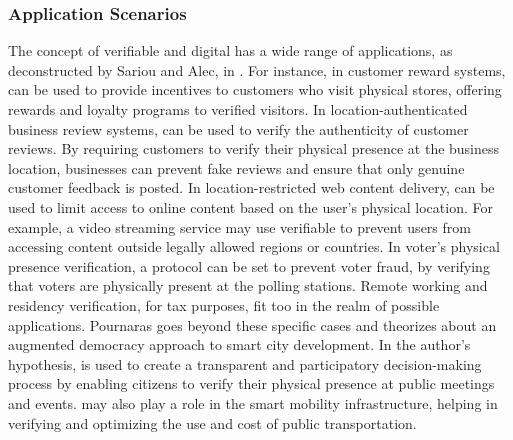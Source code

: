 \subsubsection{Application Scenarios}
\label{sec:background-proof-of-location-application-scenarios}

The concept of verifiable and digital \pol{} has a wide range of applications, as deconstructed by Sariou and Alec, in \cite{saroiu2009enabling}. For instance, in customer reward systems, \pol{} can be used to provide incentives to customers who visit physical stores, offering rewards and loyalty programs to verified visitors. In location-authenticated business review systems, \pol{} can be used to verify the authenticity of customer reviews. By requiring customers to verify their physical presence at the business location, businesses can prevent fake reviews and ensure that only genuine customer feedback is posted. In location-restricted web content delivery, \pol{} can be used to limit access to online content based on the user's physical location. For example, a video streaming service may use verifiable \pol{} to prevent users from accessing content outside legally allowed regions or countries. In voter's physical presence verification, a \pol{} protocol can be set to prevent voter fraud, by verifying that voters are physically present at the polling stations. Remote working and residency verification, for tax purposes, fit too in the realm of possible applications. Pournaras \cite{pournaras2020proof} goes beyond these specific cases and theorizes about an augmented democracy approach to smart city development. In the author's hypothesis, \pol{} is used to create a transparent and participatory decision-making process by enabling citizens to verify their physical presence at public meetings and events. \pol{} may also play a role in the smart mobility infrastructure, helping in verifying and optimizing the use and cost of public transportation.

